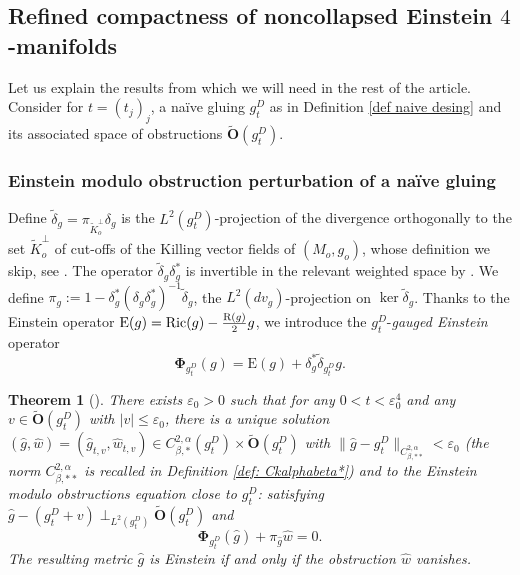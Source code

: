 \documentclass[11pt,reqno]{amsart}
\numberwithin{equation}{section}
\newcommand{\Ric}{{\rm Ric}}
\newcommand{\R}{\mathrm{R}}
\newcommand{\E}{\mathrm{E}}
\newtheorem{thm}{Theorem}[section]
\theoremstyle{definition}
\theoremstyle{remark}
\begin{document}
\subsection{Refined compactness of noncollapsed Einstein $4$-manifolds}\label{sec:compactness dim 4}

Let us explain the results from \cite{ozu1,ozu2,ozuthese} which we will need in the rest of the article. Consider for $t= (t_j)_j$, a naïve gluing $g^D_t$ as in Definition \ref{def naive desing} and its associated space of obstructions $\tilde{\mathbf{O}}(g^D_t)$.

\subsubsection{Einstein modulo obstruction perturbation of a naïve gluing}


Define $\tilde{\delta}_{g} = \pi_{\tilde{K}_o^\perp} \delta_g$ is the $L^2(g^D_{t})$-projection of the divergence orthogonally to the set $\tilde{K}_o^\perp$ of cut-offs of the Killing vector fields of $(M_o,g_o)$, whose definition we skip, see \cite[Section 3.2]{ozu2}. The operator $\tilde{\delta}_g\delta_g^*$ is invertible in the relevant weighted space by \cite[Proposition 3.3]{ozu2}. We define $\pi_g:= 1-\delta_g^*(\delta_g\delta_g^*)^{-1}\tilde{\delta}_g$, the $L^2(dv_g)$-projection on $\ker \tilde{\delta}_g$. Thanks to the Einstein operator $\E(g) = \Ric(g)-\frac{\R(g)}{2}g$, we introduce the $g^D_t$-\textit{gauged Einstein} operator 
$$\mathbf{\Phi}_{g^D_{t}}(g) = \E(g) + \delta_g^*\tilde{\delta}_{g^D_{t}}g.$$

\begin{thm}[{\cite[Theorem 4.6 and Remark 4.56]{ozu2}}]\label{thm: pert mod obst}
    There exists $\varepsilon_0>0$ such that for any $0<t<\varepsilon_0^4$ and any $v\in\tilde{\mathbf{O}}(g^D_t)$ with $|v|\leqslant \varepsilon_0$, there is a \emph{unique} solution $(\hat g,\hat w) = (\hat g_{t,v},\hat w_{t,v}) \in C^{2,\alpha}_{\beta,*}(g^D_{t })\times \tilde{\mathbf{O}}(g^D_{t }) $ with $\|\hat g-g^D_t\|_{C^{2,\alpha}_{\beta,**}} {< \varepsilon_0}$ (the norm ${C^{2,\alpha}_{\beta,**}}$ is recalled in Definition \ref{def: Ckalphabeta*}) and to the \textit{Einstein modulo obstructions} equation close to $g^D_{t}$: satisfying $\hat g-(g^D_{t}+v) \perp_{L^2(g^D_{t})}\tilde{\mathbf{O}}(g^D_t)$ and 
\begin{equation}\label{eq:RF mod obst}
    \mathbf{\Phi}_{g^D_{t}}(\hat g) + \pi_{\hat g} \hat w =0.
\end{equation}
The resulting metric $\hat{g}$ is Einstein \emph{if and only if} the obstruction $\hat{w}$ vanishes. 
\end{thm}
\end{document}
